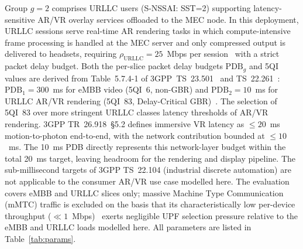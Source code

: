 \documentclass[conference]{IEEEtran}
\begin{document}
Group $g=2$ comprises URLLC users (S-NSSAI: SST=2)
supporting latency-sensitive AR/VR overlay services
offloaded to the MEC node. In this deployment, URLLC
sessions serve real-time AR rendering tasks in which
compute-intensive frame processing is handled at the
MEC server and only compressed output is delivered
to headsets, requiring $\rho_\text{URLLC} = 25$~Mbps
per session~\cite{yaqoob2020survey_360video} with a
strict packet delay budget. Both the per-slice
packet delay budgets $\text{PDB}_g$ and 5QI values
are derived from Table~5.7.4-1 of
3GPP~TS~23.501~\cite{3gpp_ts23501} and
TS~22.261~\cite{3gpp_ts22261}: $\text{PDB}_1 = 300$~ms
for eMBB video (5QI~6, non-GBR) and
$\text{PDB}_2 = 10$~ms for URLLC AR/VR rendering
(5QI~83, Delay-Critical GBR)~\cite{3gpp_ts22261}.
The selection of 5QI~83 over more stringent URLLC classes
latency thresholds of AR/VR rendering. 3GPP TR~26.918~\S5.2
defines immersive VR latency as $\leq 20$~ms motion-to-photon
end-to-end, with the network contribution bounded at $\leq 10$~ms.
The 10~ms PDB directly represents this network-layer budget
within the total 20~ms target, leaving headroom for the
rendering and display pipeline. The sub-millisecond targets of
3GPP TS~22.104 (industrial discrete automation) are
not applicable to the consumer AR/VR use case modelled here.
The evaluation covers eMBB and URLLC slices only;
massive Machine Type Communication (mMTC) traffic is excluded
on the basis that its characteristically low per-device
throughput ($\ll 1$~Mbps)~\cite{3gpp_ts22261} exerts negligible UPF selection
pressure relative to the eMBB and URLLC loads modelled here.
All parameters are listed in Table~\ref{tab:params}.
\end{document}
